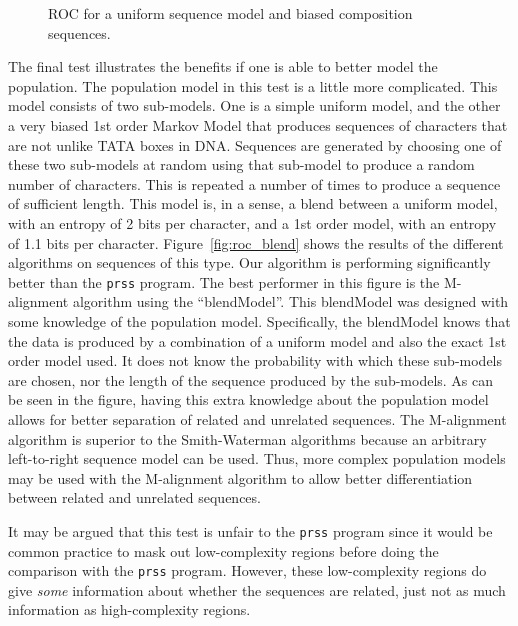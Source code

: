 \documentclass[letterpaper,11pt,oneside]{article}
\def\plotwidth{0.7\columnwidth}
\begin{document}

\begin{figure}
\centering
\epsfig{file=roc_uni_0.eps, width=\plotwidth}
\caption{\label{fig:roc_uni_0}ROC for a uniform sequence model and biased composition sequences.}
\end{figure}

The final test illustrates the benefits if one is able to better model the
population.  The population model in this test is a little more complicated.
This model consists of two sub-models.  One is a simple uniform model, and the
other a very biased 1st order Markov Model that produces sequences of
characters that are not unlike TATA boxes in DNA.  Sequences are generated by
choosing one of these two sub-models at random using that sub-model to produce
a random number of characters.  This is repeated a number of times to produce
a sequence of sufficient length.  This model is, in a sense, a blend between a
uniform model, with an entropy of 2 bits per character, and a 1st order model,
with an entropy of 1.1 bits per character.  Figure~\ref{fig:roc_blend} shows
the results of the different algorithms on sequences of this type.  Our
algorithm is performing significantly better than the \verb!prss! program.
The best performer in this figure is the M-alignment algorithm using the
``blendModel''.  This blendModel was designed with some knowledge of the
population model.  Specifically, the blendModel knows that the data is
produced by a combination of a uniform model and also the exact 1st order
model used.  It does not know the probability with which these sub-models are
chosen, nor the length of the sequence produced by the sub-models.  As can be
seen in the figure, having this extra knowledge about the population model
allows for better separation of related and unrelated sequences.  The
M-alignment algorithm is superior to the Smith-Waterman algorithms because an
arbitrary left-to-right sequence model can be used.  Thus, more complex
population models may be used with the M-alignment algorithm to allow better
differentiation between related and unrelated sequences.


It may be argued that this test is unfair to the \verb!prss! program since it
would be common practice to mask out low-complexity regions before doing the
comparison with the \verb!prss! program.  However, these low-complexity
regions do give \emph{some} information about whether the sequences are
related, just not as much information as high-complexity regions.
\end{document}
